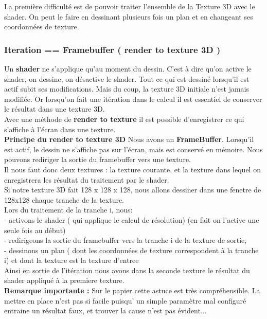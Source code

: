 \documentclass[a4paper,10pt]{article}
\begin{document}
La première difficulté est de pouvoir traiter l'ensemble de la Texture 3D avec le
shader. On peut le faire en dessinant plusieurs fois un plan et en 
changeant ses coordonnées de texture.


\subsubsection{Iteration == Framebuffer ( render to texture 3D ) }
Un \textbf{shader} ne s'applique qu'au moment du dessin.
C'est à dire qu'on active le shader, on dessine, on désactive le shader. Tout
ce qui est dessiné lorsqu'il est actif subit ses modifications. Mais du coup,
la texture 3D initiale n'est jamais modifiée. Or lorsqu'on fait une itération
dans le calcul il est essentiel de conserver le résultat dans une texture 3D.\\
Avec une méthode de \textbf{render to texture} il est possible d'enregistrer ce
qui s'affiche à l'écran dans une texture.\\

\textbf{Principe du render to texture 3D}
Nous avons un \textbf{FrameBuffer}. Lorsqu'il est actif, le dessin ne s'affiche pas
 sur l'écran, mais est conservé en mémoire. Nous pouvons rediriger la sortie
 du framebuffer vers une texture. \\
 Il nous faut donc deux textures : la texture courante, et la texture dans lequel
 on enregistrera les résultat du traitement par le shader.\\
 
 Si notre texture 3D fait 128 x 128 x 128, nous allons dessiner dans une fenetre
 de 128x128 chaque tranche de la texture. \\
 Lors du traitement de la tranche i, nous:\\
    - activons le shader ( qui applique le calcul de résolution) (en fait on l'active une seule fois au début)\\
    - redirigeons la sortie du framebuffer vers la tranche i de la texture de sortie,\\
    - dessinons un plan ( dont les coordonnées de texture correspondent à la tranche i) 
    et dont la texture est la texture d'entree\\
    
 Ainsi en sortie de l'itération nous avons dans la seconde texture le résultat du shader appliqué à la premiere texture.\\
 
 \textbf{Remarque importante : } Sur le papier cette astuce est très compréhensible. La mettre en place n'est pas si facile
 puisqu' un simple paramètre mal configuré entraine un résultat faux, et trouver la cause n'est pas évident...
 
\end{document}
